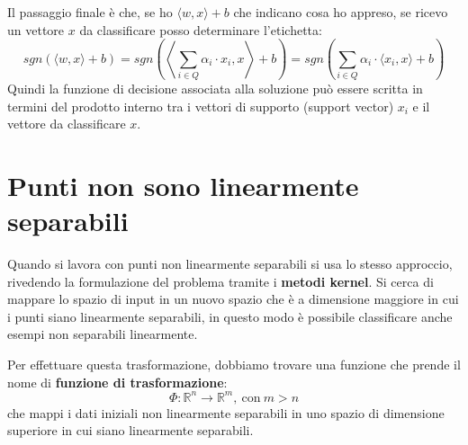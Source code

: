 Il passaggio finale è che, se ho $\langle w, x \rangle + b$ che indicano cosa ho
appreso, se ricevo un vettore $x$ da classificare posso determinare l'etichetta:
\begin{equation}
    sgn(\langle w, x \rangle + b) = sgn\left(\left\langle \sum_{i \in Q} \alpha_i
    \cdot x_i, x \right\rangle + b \right) = sgn\left(\sum_{i \in Q} \alpha_i
    \cdot \langle x_i, x\rangle + b \right)
\end{equation}
Quindi la funzione di decisione associata alla soluzione può essere scritta in
termini del prodotto interno tra i vettori di supporto (support vector) $x_i$ e
il vettore da classificare $x$.
\section{Punti non sono linearmente separabili}
Quando si lavora con punti non linearmente separabili si usa lo stesso approccio,
rivedendo la formulazione del problema tramite i \textbf{metodi kernel}.
Si cerca di mappare lo spazio di input in un nuovo spazio che è a dimensione maggiore
in cui i punti siano linearmente separabili, in questo modo è possibile classificare
anche esempi non separabili linearmente.

Per effettuare questa trasformazione, dobbiamo trovare una funzione che prende
il nome di \textbf{funzione di trasformazione}:
\begin{equation}
    \Phi: \mathbb{R}^n \to \mathbb{R}^m, \ \text{con} \ m > n
\end{equation}
che mappi i dati iniziali non linearmente separabili in uno spazio di dimensione
superiore in cui siano linearmente separabili.

